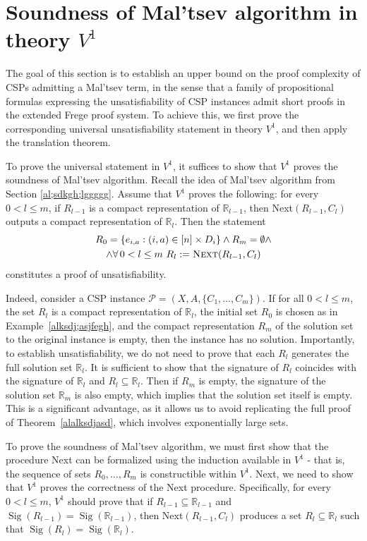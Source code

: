 \documentclass{article}
\newcommand{\R}{\mathbb{R}}
\theoremstyle{definition}
\theoremstyle{theorem}
\theoremstyle{theorem}
\theoremstyle{remark}
\theoremstyle{remark}
\theoremstyle{example}
\theoremstyle{notation}
\theoremstyle{theorem}
\begin{document}
\section{Soundness of Mal'tsev algorithm in theory $V^1$}\label{alskdyf;kajdsghy;kgj}

The goal of this section is to establish an upper bound on the proof complexity of CSPs admitting a Mal'tsev term, in the sense that a family of propositional formulas expressing the unsatisfiability of CSP instances admit short proofs in the extended Frege proof system. To achieve this, we first prove the corresponding universal unsatisfiability statement in theory $V^1$, and then apply the translation theorem.

To prove the universal statement in $V^1$, it suffices to show that $V^1$ proves the soundness of Mal'tsev algorithm. Recall the idea of Mal'tsev algorithm from Section \ref{al;sdkgh;lggggg}. Assume that $V^1$ proves the following: for every $0 < l \leq m$, if $R_{l-1}$ is a compact representation of $\R_{l-1}$, then {\sc Next}$(R_{l-1}, C_l)$ outputs a compact representation of $\R_l$. Then the statement
\begin{gather*}
    R_0 = \{e_{i,a} : (i,a) \in [n] \times D_i\} \wedge R_m = \emptyset \wedge \\
    \wedge \forall\, 0 < l \leq m\,\, R_l := \text{{\sc Next}}(R_{l-1}, C_l)
\end{gather*}
constitutes a proof of unsatisfiability. 

Indeed, consider a CSP instance $\mathcal{P} = (X, A, \{C_1, \ldots, C_m\})$. If for all $0 < l \leq m$, the set $R_l$ is a compact representation of $\R_l$, the initial set $R_0$ is chosen as in Example~\ref{alksdj;asjfegh}, and the compact representation $R_m$ of the solution set to the original instance is empty, then the instance has no solution. Importantly, to establish unsatisfiability, we do not need to prove that each $R_l$ generates the full solution set $\R_l$. It is sufficient to show that the signature of $R_l$ coincides with the signature of $\R_l$ and $R_l\subseteq \R_l$. Then if $R_m$ is empty, the signature of the solution set $\R_m$ is also empty, which implies that the solution set itself is empty. This is a significant advantage, as it allows us to avoid replicating the full proof of Theorem~\ref{alalksdjasd}, which involves exponentially large sets.

To prove the soundness of Mal'tsev algorithm, we must first show that the procedure {\sc Next} can be formalized using the induction available in $V^1$ - that is, the sequence of sets $R_0, \ldots, R_m$ is constructible within $V^1$. Next, we need to show that $V^1$ proves the correctness of the {\sc Next} procedure. Specifically, for every $0 < l \leq m$, $V^1$ should prove that if $R_{l-1} \subseteq \R_{l-1}$ and $\operatorname{Sig}(R_{l-1}) = \operatorname{Sig}(\R_{l-1})$, then {\sc Next}$(R_{l-1}, C_l)$ produces a set $R_l \subseteq \R_l$ such that $\operatorname{Sig}(R_l) = \operatorname{Sig}(\R_l)$.
\end{document}
